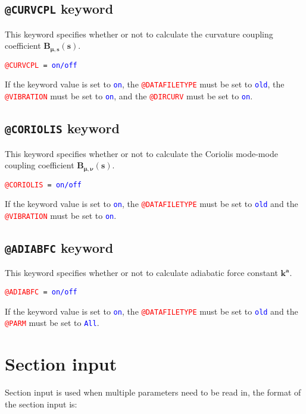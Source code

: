 \subsection{\texttt{@CURVCPL} keyword}
This keyword specifies whether or not to calculate the curvature coupling coefficient $\boldsymbol{B_{\mu,s}(s)}$.

\texttt{\textcolor{red}{@CURVCPL} = \textcolor{blue}{on/off}  }

If the keyword value is set to \texttt{\textcolor{blue}{on}},
the \texttt{\textcolor{red}{@DATAFILETYPE}} must be set to \texttt{\textcolor{blue}{old}}, 
the \texttt{\textcolor{red}{@VIBRATION}} must be set to \texttt{\textcolor{blue}{on}}, 
and the \texttt{\textcolor{red}{@DIRCURV}} must be set to \texttt{\textcolor{blue}{on}}.


\subsection{\texttt{@CORIOLIS} keyword}
This keyword specifies whether or not to calculate the Coriolis mode-mode coupling coefficient $\boldsymbol{B_{\mu,\nu}(s)}$.

\texttt{\textcolor{red}{@CORIOLIS} = \textcolor{blue}{on/off}  }

If the keyword value is set to \texttt{\textcolor{blue}{on}},
the \texttt{\textcolor{red}{@DATAFILETYPE}} must be set to \texttt{\textcolor{blue}{old}} and the \texttt{\textcolor{red}{@VIBRATION}} must be set to \texttt{\textcolor{blue}{on}}.




\subsection{\texttt{@ADIABFC} keyword}
This keyword specifies whether or not to calculate adiabatic force constant $\mathbf{k^a}$.

\texttt{\textcolor{red}{@ADIABFC} = \textcolor{blue}{on/off}  }

If the keyword value is set to \texttt{\textcolor{blue}{on}},
the \texttt{\textcolor{red}{@DATAFILETYPE}} must be set to \texttt{\textcolor{blue}{old}} and the \texttt{\textcolor{red}{@PARM}} must be set to \texttt{\textcolor{blue}{All}}.





\section{Section input}
Section input is used when multiple parameters need to be read in, the format of the section input is:

